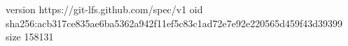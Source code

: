 version https://git-lfs.github.com/spec/v1
oid sha256:acb317ce835ae6ba5362a942f11ef5c83c1ad72e7e92e220565d459f43d39399
size 158131
